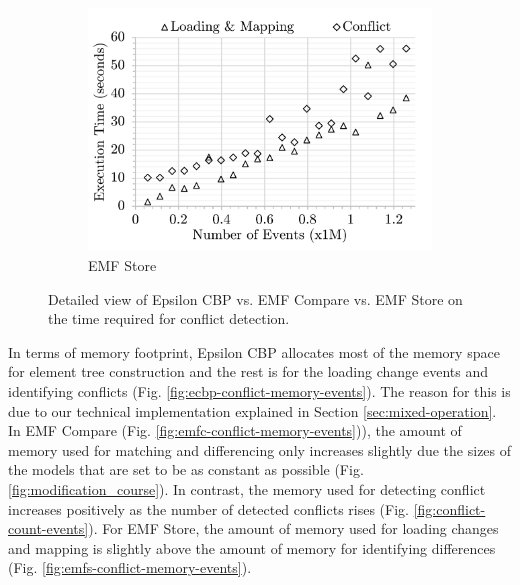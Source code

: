 \begin{figure}[ht]
\begin{subfigure}[t]{0.32\linewidth}
        \includegraphics[width=\linewidth]{emfs-conflict-time-events}
        \caption{EMF Store}
        \label{fig:emfs-conflict-time-events}
    \end{subfigure}
    \caption{Detailed view of Epsilon CBP vs. EMF Compare vs. EMF Store on the time required for conflict detection.}
    \label{fig:conflict_time_events}
\end{figure}

In terms of memory footprint, Epsilon CBP allocates most of the memory space for element tree construction and the rest is for the loading change events and identifying conflicts (Fig. \ref{fig:ecbp-conflict-memory-events}). The reason for this is due to our technical implementation explained in Section \ref{sec:mixed-operation}. In EMF Compare (Fig. \ref{fig:emfc-conflict-memory-events})), the amount of memory used for matching and differencing only increases slightly due the sizes of the models that are set to be as constant as possible (Fig. \ref{fig:modification_course}). In contrast, the memory used for detecting conflict increases positively as the number of detected conflicts rises (Fig. \ref{fig:conflict-count-events}). For EMF Store, the amount of memory used for loading changes and mapping is slightly above the amount of memory for identifying differences (Fig. \ref{fig:emfs-conflict-memory-events}).

